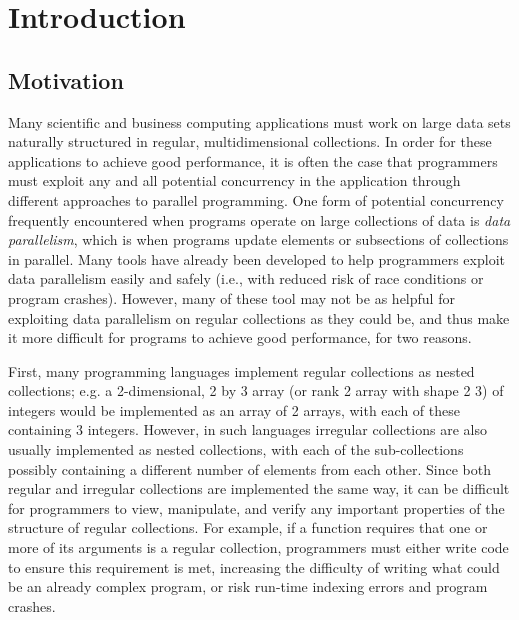\chapter{Introduction}

\section{Motivation}
Many scientific and business computing applications must work on large data sets naturally structured in regular, multidimensional collections.
In order for these applications to achieve good performance, 
it is often the case that programmers must exploit any and all potential concurrency in the application 
through different approaches to parallel programming.
One form of potential concurrency frequently encountered when programs operate on large collections of data 
is \textit{data parallelism}, which is when programs update elements or subsections of collections in parallel.
Many tools have already been developed to help programmers exploit data parallelism %
easily and safely (i.e., with reduced risk of race conditions or program crashes). %
However, many of these tool may not be as helpful 
for exploiting data parallelism on regular collections as they could be, 
and thus make it more difficult for programs to achieve good performance, for two reasons.

First, many programming languages implement regular collections as nested collections;
e.g. a 2-dimensional, 2 by 3 array (or rank 2 array with shape 2 3) of integers would be implemented as 
an array of 2 arrays, with each of these containing 3 integers. %
However, in such languages irregular collections are also usually implemented as nested collections, 
with each of the sub-collections possibly containing a different number of elements from each other.
Since both regular and irregular collections are implemented the same way,
it can be difficult for programmers to view, manipulate, and verify 
any important properties of the structure of regular collections.
For example, if a function requires that one or more of its arguments is a regular collection, 
programmers must either write code to ensure this requirement is met,
increasing the difficulty of writing what could be an already complex program, 
or risk run-time indexing errors and program crashes.

